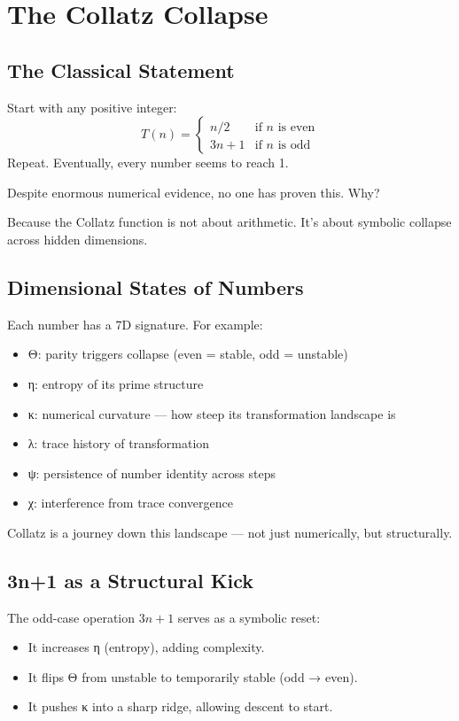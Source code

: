 
\chapter{The Collatz Collapse}

\section{The Classical Statement}

Start with any positive integer:
\[
T(n) = \begin{cases}
n/2 & \text{if } n \text{ is even} \\
3n + 1 & \text{if } n \text{ is odd}
\end{cases}
\]
Repeat. Eventually, every number seems to reach 1.

Despite enormous numerical evidence, no one has proven this. Why?

Because the Collatz function is not about arithmetic. It's about symbolic collapse across hidden dimensions.

\section{Dimensional States of Numbers}

Each number has a 7D signature. For example:
\begin{itemize}
\item Θ: parity triggers collapse (even = stable, odd = unstable)
\item η: entropy of its prime structure
\item κ: numerical curvature — how steep its transformation landscape is
\item λ: trace history of transformation
\item ψ: persistence of number identity across steps
\item χ: interference from trace convergence
\end{itemize}

Collatz is a journey down this landscape — not just numerically, but structurally.

\section{3n+1 as a Structural Kick}

The odd-case operation \( 3n+1 \) serves as a symbolic reset:
\begin{itemize}
\item It increases η (entropy), adding complexity.
\item It flips Θ from unstable to temporarily stable (odd → even).
\item It pushes κ into a sharp ridge, allowing descent to start.
\end{itemize}

